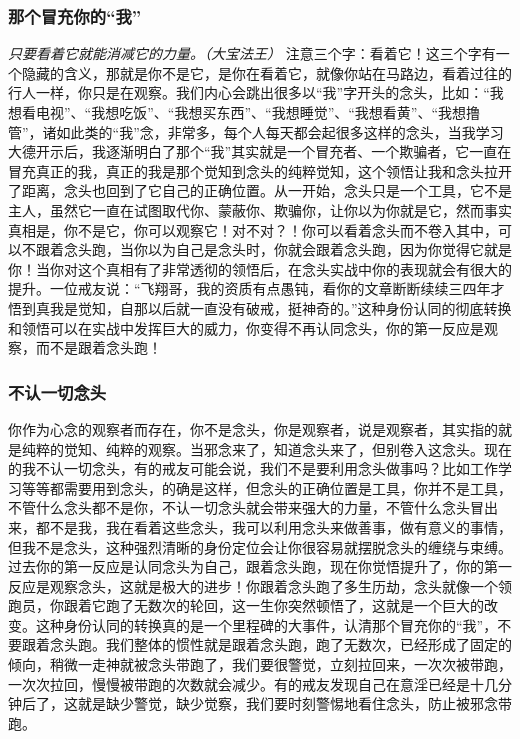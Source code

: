 \subsubsection{那个冒充你的“我”}

\textit{只要看着它就能消减它的力量。（大宝法王）} 注意三个字：看着它！这三个字有一个隐藏的含义，那就是你不是它，是你在看着它，就像你站在马路边，看着过往的行人一样，你只是在观察。我们内心会跳出很多以“我”字开头的念头，比如：“我想看电视”、“我想吃饭”、“我想买东西”、“我想睡觉”、“我想看黄”、“我想撸管”，诸如此类的“我”念，非常多，每个人每天都会起很多这样的念头，当我学习大德开示后，我逐渐明白了那个“我”其实就是一个冒充者、一个欺骗者，它一直在冒充真正的我，真正的我是那个觉知到念头的纯粹觉知，这个领悟让我和念头拉开了距离，念头也回到了它自己的正确位置。从一开始，念头只是一个工具，它不是主人，虽然它一直在试图取代你、蒙蔽你、欺骗你，让你以为你就是它，然而事实真相是，你不是它，你可以观察它！对不对？！你可以看着念头而不卷入其中，可以不跟着念头跑，当你以为自己是念头时，你就会跟着念头跑，因为你觉得它就是你！当你对这个真相有了非常透彻的领悟后，在念头实战中你的表现就会有很大的提升。一位戒友说：“飞翔哥，我的资质有点愚钝，看你的文章断断续续三四年才悟到真我是觉知，自那以后就一直没有破戒，挺神奇的。”这种身份认同的彻底转换和领悟可以在实战中发挥巨大的威力，你变得不再认同念头，你的第一反应是观察，而不是跟着念头跑！

\subsubsection{不认一切念头}

你作为心念的观察者而存在，你不是念头，你是观察者，说是观察者，其实指的就是纯粹的觉知、纯粹的观察。当邪念来了，知道念头来了，但别卷入这念头。现在的我不认一切念头，有的戒友可能会说，我们不是要利用念头做事吗？比如工作学习等等都需要用到念头，的确是这样，但念头的正确位置是工具，你并不是工具，不管什么念头都不是你，不认一切念头就会带来强大的力量，不管什么念头冒出来，都不是我，我在看着这些念头，我可以利用念头来做善事，做有意义的事情，但我不是念头，这种强烈清晰的身份定位会让你很容易就摆脱念头的缠绕与束缚。过去你的第一反应是认同念头为自己，跟着念头跑，现在你觉悟提升了，你的第一反应是观察念头，这就是极大的进步！你跟着念头跑了多生历劫，念头就像一个领跑员，你跟着它跑了无数次的轮回，这一生你突然顿悟了，这就是一个巨大的改变。这种身份认同的转换真的是一个里程碑的大事件，认清那个冒充你的“我”，不要跟着念头跑。我们整体的惯性就是跟着念头跑，跑了无数次，已经形成了固定的倾向，稍微一走神就被念头带跑了，我们要很警觉，立刻拉回来，一次次被带跑，一次次拉回，慢慢被带跑的次数就会减少。有的戒友发现自己在意淫已经是十几分钟后了，这就是缺少警觉，缺少觉察，我们要时刻警惕地看住念头，防止被邪念带跑。


